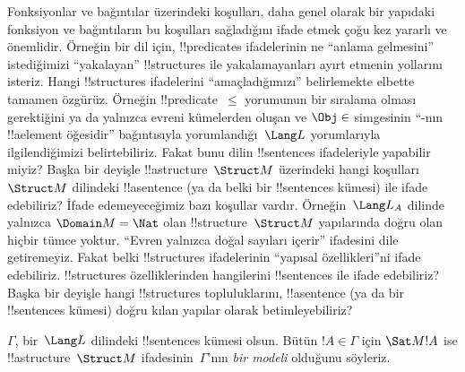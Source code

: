 



\begin{explain}
Fonksiyonlar ve bağıntılar üzerindeki koşulları, daha genel olarak bir
yapıdaki fonksiyon ve bağıntıların bu koşulları sağladığını ifade etmek
çoğu kez yararlı ve önemlidir. Örneğin bir dil için, !!{predicate}s
ifadelerinin ne ``anlama gelmesini'' istediğimizi ``yakalayan''
!!{structure}s ile yakalamayanları ayırt etmenin yollarını isteriz.
Hangi !!{structure}s ifadelerini ``amaçladığımızı'' belirlemekte
elbette tamamen özgürüz. Örneğin !!{predicate}~$\le$ yorumunun bir
sıralama olması gerektiğini ya da yalnızca evreni kümelerden oluşan ve
$\Obj\in$ simgesinin ``-nın !!a{element} öğesidir'' bağıntısıyla
yorumlandığı~$\Lang L$ yorumlarıyla ilgilendiğimizi belirtebiliriz.
Fakat bunu dilin !!{sentence}s ifadeleriyle yapabilir miyiz? Başka bir
deyişle !!a{structure}~$\Struct M$ üzerindeki hangi koşulları
$\Struct M$ dilindeki !!a{sentence} (ya da belki bir !!{sentence}s
kümesi) ile ifade edebiliriz? İfade edemeyeceğimiz bazı koşullar
vardır. Örneğin~$\Lang L_A$ dilinde yalnızca
$\Domain M=\Nat$ olan !!{structure}~$\Struct M$ yapılarında doğru olan
hiçbir tümce yoktur. ``Evren yalnızca doğal sayıları içerir''
ifadesini dile getiremeyiz. Fakat belki !!{structure}s ifadelerinin
``yapısal özellikleri''ni ifade edebiliriz. !!{structure}s
özelliklerinden hangilerini !!{sentence}s ile ifade edebiliriz? Başka
bir deyişle hangi !!{structure}s topluluklarını, !!a{sentence} (ya da
bir !!{sentence}s kümesi) doğru kılan yapılar olarak betimleyebiliriz?
\end{explain}

\begin{defn}
$\Gamma$, bir~$\Lang L$ dilindeki !!{sentence}s kümesi olsun. Bütün
$!A\in\Gamma$ için $\Sat M{!A}$ ise !!a{structure}~$\Struct M$
ifadesinin~$\Gamma$'nın \emph{bir modeli} olduğunu söyleriz.
\end{defn}

